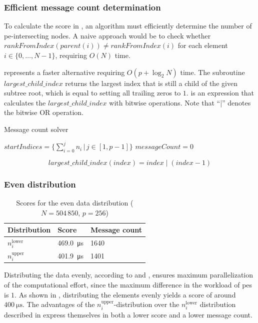 \subsubsection{Efficient message count determination}
To calculate the score in , an algorithm must efficiently determine the number of \gls{pe}-intersecting nodes.
A naive approach would be to check whether $rankFromIndex(parent(i)) \neq rankFromIndex(i)$ for each element $i \in \{0, \ldots, N-1\}$, requiring $O(N)$ time.

 represents a faster alternative requiring $O(p + \log_2 N)$ time.
The subroutine $largest\_child\_index$ returns the largest index that is still a child of the given subtree root, which is equal to setting all trailing zeros to $1$.
 is an expression that calculates the $largest\_child\_index$ with bitwise operations.
Note that \enquote{|} denotes the bitwise OR operation.
\begin{algorithm}
\caption{Message count solver}\label{algo:MessageCountSolver}
\DontPrintSemicolon
\SetAlgoLined
$startIndices = \{\sum_{i=0}^j n_i \,\big|\, j \in [1, p-1] \}$\;
$messageCount = 0$\;
\end{algorithm}
\begin{equation}
\label{eq:LargestChildIndex}
largest\_child\_index(index) = index \;|\; (index - 1)
\end{equation}


\subsubsection{Even distribution}

\begin{table}
\centering
\begin{tabular}{l|l|l}
Distribution & Score & Message count \\
\hline
$n_i^\textrm{lower}$ & \SI{469.0}{\micro\second} & 1640 \\
$n_i^\textrm{upper}$ & \SI{401.9}{\micro\second} & 1401
\end{tabular}
\caption{Scores for the even data distribution ($N = 504\,850$, $p=256$)}
\label{table:EvenDistributionScores}
\end{table}
Distributing the data evenly, according to  and , ensures maximum parallelization of the computational effort, since the maximum difference in the workload of \glspl{pe} is $1$.
As shown in , distributing the elements evenly yields a score of around $\SI{400}{\micro\second}$.
The advantages of the $n_i^\textrm{upper}$-distribution over the $n_i^\textrm{lower}$ distribution described in  express themselves in both a lower score and a lower message count.

